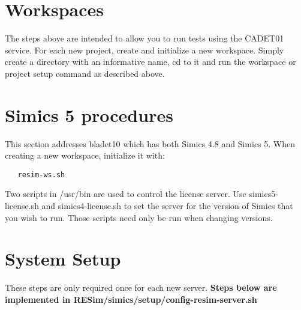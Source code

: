 \documentclass[titlepage]{article}
\begin{document}
\section{Workspaces}
The steps above are intended to allow you to run tests using the CADET01 service. 
For each new project, create and initialize a new workspace.  Simply create a directory
with an informative name, cd to it and run the workspace or project setup command as described above.

\section{Simics 5 procedures}
This section addresses bladet10 which has both Simics 4.8 and Simics 5.
When creating a new workspace, initialize it with:
\begin{verbatim}
   resim-ws.sh
\end{verbatim}

Two scripts in /usr/bin are used to control the license server.  Use simics5-license.sh and simics4-license.sh to set the server for the
version of Simics that you wish to run.  Those scripts need only be run when changing versions.

\section{System Setup} 
\label{section-system}
These steps are only required once for each new server.
\textbf{Steps below are implemented in RESim/simics/setup/config-resim-server.sh}
\end{document}
